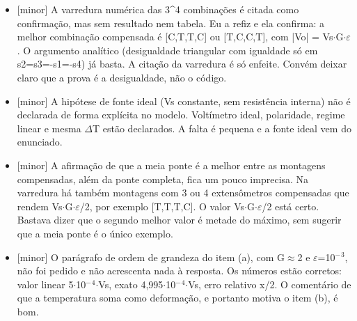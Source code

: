 \documentclass{article}%
\begin{document}
\begin{itemize}%
\item%
{[}minor{]} A varredura numérica das 3\^{}4 combinações é citada como confirmação, mas sem resultado nem tabela. Eu a refiz e ela confirma: a melhor combinação compensada é {[}C,T,T,C{]} ou {[}T,C,C,T{]}, com |Vo| = Vs$\cdot$G$\cdot$$\varepsilon$. O argumento analítico (desigualdade triangular com igualdade só em s2=s3=-s1=-s4) já basta. A citação da varredura é só enfeite. Convém deixar claro que a prova é a desigualdade, não o código.%
\item%
{[}minor{]} A hipótese de fonte ideal (Vs constante, sem resistência interna) não é declarada de forma explícita no modelo. Voltímetro ideal, polaridade, regime linear e mesma $\Delta$T estão declarados. A falta é pequena e a fonte ideal vem do enunciado.%
\item%
{[}minor{]} A afirmação de que a meia ponte é a melhor entre as montagens compensadas, além da ponte completa, fica um pouco imprecisa. Na varredura há também montagens com 3 ou 4 extensômetros compensadas que rendem Vs$\cdot$G$\cdot$$\varepsilon$/2, por exemplo {[}T,T,T,C{]}. O valor Vs$\cdot$G$\cdot$$\varepsilon$/2 está certo. Bastava dizer que o segundo melhor valor é metade do máximo, sem sugerir que a meia ponte é o único exemplo.%
\item%
{[}minor{]} O parágrafo de ordem de grandeza do item (a), com G$\approx$2 e $\varepsilon$=10$^{-}$$^3$, não foi pedido e não acrescenta nada à resposta. Os números estão corretos: valor linear 5$\cdot$10$^{-}$$^{4}$$\cdot$Vs, exato 4,995$\cdot$10$^{-}$$^{4}$$\cdot$Vs, erro relativo x/2. O comentário de que a temperatura soma como deformação, e portanto motiva o item (b), é bom.%
\end{itemize}%
\end{document}
